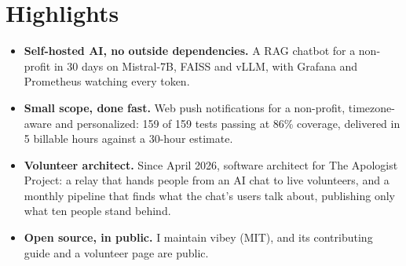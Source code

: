 \documentclass[10pt,letterpaper]{article}
\begin{document}
\section*{Highlights}
\begin{itemize}
\item \textbf{Self-hosted AI, no outside dependencies.} A RAG chatbot for a non-profit in 30 days on Mistral-7B, FAISS and vLLM, with Grafana and Prometheus watching every token.
\item \textbf{Small scope, done fast.} Web push notifications for a non-profit, timezone-aware and personalized: 159 of 159 tests passing at 86\% coverage, delivered in 5 billable hours against a 30-hour estimate.
\item \textbf{Volunteer architect.} Since April 2026, software architect for The Apologist Project: a relay that hands people from an AI chat to live volunteers, and a monthly pipeline that finds what the chat's users talk about, publishing only what ten people stand behind.
\item \textbf{Open source, in public.} I maintain vibey (MIT), and its contributing guide and a volunteer page are public.
\end{itemize}
\end{document}
